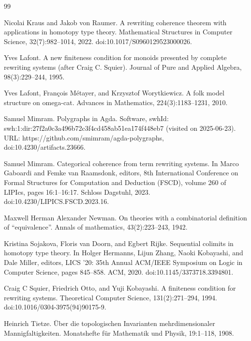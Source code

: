 \documentclass[10pt,a4paper]{amsart}
\begin{document}
\begin{thebibliography}{99}
\par\noindent  [10]  Nicolai Kraus and Jakob von Raumer.  A rewriting coherence theorem with applications in homotopy type theory.  Mathematical Structures in Computer Science, 32(7):982–1014, 2022.  doi:10.1017/S0960129523000026.  
 
\par\noindent  [11]  Yves Lafont.  A new finiteness condition for monoids presented by complete rewriting systems (after Craig C. Squier).  Journal of Pure and Applied Algebra, 98(3):229–244, 1995.  
 
\par\noindent  [12]  Yves Lafont, François Métayer, and Krzysztof Worytkiewicz.  A folk model structure on omega-cat.  Advances in Mathematics, 224(3):1183–1231, 2010.  
 
\par\noindent  [13]  Samuel Mimram.  Polygraphs in Agda.  Software, swhId: swh:1:dir:27f2a0c3a496b72c3f4cd458ab51ea174f448eb7 (visited on 2025-06-23).  URL: https://github.com/smimram/agda-polygraphs, doi:10.4230/artifacts.23666.  
 
\par\noindent  [14]  Samuel Mimram.  Categorical coherence from term rewriting systems.  In Marco Gaboardi and Femke van Raamsdonk, editors, 8th International Conference on Formal Structures for Computation and Deduction (FSCD), volume 260 of LIPIcs, pages 16:1–16:17. Schloss Dagstuhl, 2023.  doi:10.4230/LIPICS.FSCD.2023.16.  
 
\par\noindent  [15]  Maxwell Herman Alexander Newman.  On theories with a combinatorial definition of “equivalence”.  Annals of mathematics, 43(2):223–243, 1942.  
 
\par\noindent  [16]  Kristina Sojakova, Floris van Doorn, and Egbert Rijke.  Sequential colimits in homotopy type theory.  In Holger Hermanns, Lijun Zhang, Naoki Kobayashi, and Dale Miller, editors, LICS ’20: 35th Annual ACM/IEEE Symposium on Logic in Computer Science, pages 845–858. ACM, 2020.  doi:10.1145/3373718.3394801.  
 
\par\noindent  [17]  Craig C Squier, Friedrich Otto, and Yuji Kobayashi.  A finiteness condition for rewriting systems.  Theoretical Computer Science, 131(2):271–294, 1994.  doi:10.1016/0304-3975(94)90175-9.  
 
\par\noindent  [18]  Heinrich Tietze.  Über die topologischen Invarianten mehrdimensionaler Mannigfaltigkeiten.  Monatshefte für Mathematik und Physik, 19:1–118, 1908.  
 

\end{thebibliography}
\end{document}
